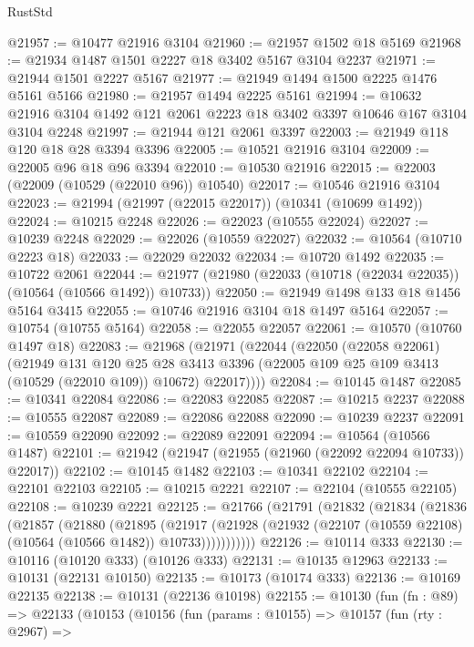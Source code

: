 \begin{lexlean}{RustStd}
\begin{coremodule}
@21957 := @10477 @21916 @3104
@21960 := @21957 @1502 @18 @5169
@21968 := @21934 @1487 @1501 @2227 @18 @3402 @5167 @3104 @2237
@21971 := @21944 @1501 @2227 @5167
@21977 := @21949 @1494 @1500 @2225 @1476 @5161 @5166
@21980 := @21957 @1494 @2225 @5161
@21994 := @10632 @21916 @3104 @1492 @121 @2061 @2223 @18 @3402 @3397 @10646 @167 @3104 @3104 @2248
@21997 := @21944 @121 @2061 @3397
@22003 := @21949 @118 @120 @18 @28 @3394 @3396
@22005 := @10521 @21916 @3104
@22009 := @22005 @96 @18 @96 @3394
@22010 := @10530 @21916
@22015 := @22003 (@22009 (@10529 (@22010 @96)) @10540)
@22017 := @10546 @21916 @3104
@22023 := @21994 (@21997 (@22015 @22017)) (@10341 (@10699 @1492))
@22024 := @10215 @2248
@22026 := @22023 (@10555 @22024)
@22027 := @10239 @2248
@22029 := @22026 (@10559 @22027)
@22032 := @10564 (@10710 @2223 @18)
@22033 := @22029 @22032
@22034 := @10720 @1492
@22035 := @10722 @2061
@22044 := @21977 (@21980 (@22033 (@10718 (@22034 @22035)) (@10564 (@10566 @1492)) @10733))
@22050 := @21949 @1498 @133 @18 @1456 @5164 @3415
@22055 := @10746 @21916 @3104 @18 @1497 @5164
@22057 := @10754 (@10755 @5164)
@22058 := @22055 @22057
@22061 := @10570 (@10760 @1497 @18)
@22083 := @21968
    (@21971
      (@22044
        (@22050
          (@22058 @22061)
          (@21949
            @131
            @120
            @25
            @28
            @3413
            @3396
            (@22005 @109 @25 @109 @3413 (@10529 (@22010 @109)) @10672)
            @22017))))
@22084 := @10145 @1487
@22085 := @10341 @22084
@22086 := @22083 @22085
@22087 := @10215 @2237
@22088 := @10555 @22087
@22089 := @22086 @22088
@22090 := @10239 @2237
@22091 := @10559 @22090
@22092 := @22089 @22091
@22094 := @10564 (@10566 @1487)
@22101 := @21942 (@21947 (@21955 (@21960 (@22092 @22094 @10733)) @22017))
@22102 := @10145 @1482
@22103 := @10341 @22102
@22104 := @22101 @22103
@22105 := @10215 @2221
@22107 := @22104 (@10555 @22105)
@22108 := @10239 @2221
@22125 := @21766
    (@21791
      (@21832
        (@21834
          (@21836
            (@21857
              (@21880
                (@21895
                  (@21917
                    (@21928
                      (@21932 (@22107 (@10559 @22108) (@10564 (@10566 @1482)) @10733)))))))))))
@22126 := @10114 @333
@22130 := @10116 (@10120 @333) (@10126 @333)
@22131 := @10135 @12963
@22133 := @10131 (@22131 @10150)
@22135 := @10173 (@10174 @333)
@22136 := @10169 @22135
@22138 := @10131 (@22136 @10198)
@22155 := @10130
    (fun (fn : @89) =>
    @22133
      (@10153
        (@10156
          (fun (params : @10155) =>
          @10157
            (fun (rty : @2967) =>

\end{coremodule}
\end{lexlean}
